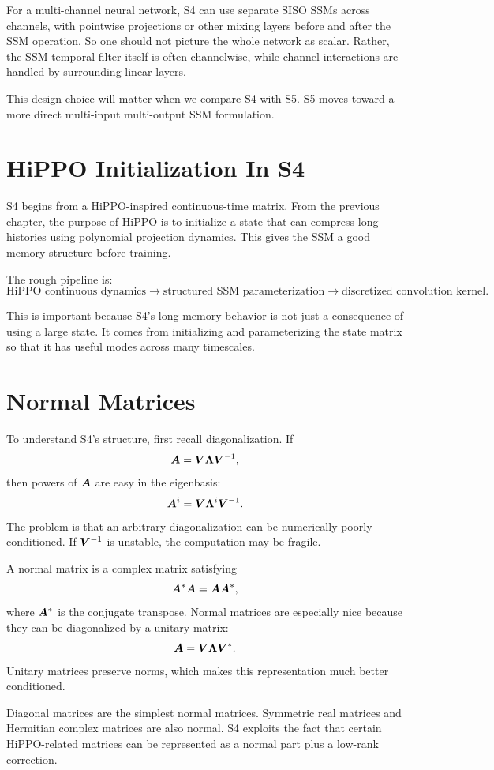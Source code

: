 For a multi-channel neural network, S4 can use separate SISO SSMs across channels, with
pointwise projections or other mixing layers before and after the SSM operation. So one
should not picture the whole network as scalar. Rather, the SSM temporal filter itself is
often channelwise, while channel interactions are handled by surrounding linear layers.

This design choice will matter when we compare S4 with S5. S5 moves toward a more direct
multi-input multi-output SSM formulation.

\section{HiPPO Initialization In S4}

S4 begins from a HiPPO-inspired continuous-time matrix. From the previous chapter, the
purpose of HiPPO is to initialize a state that can compress long histories using
polynomial projection dynamics. This gives the SSM a good memory structure before
training.

The rough pipeline is:
\[
  \text{HiPPO continuous dynamics}
  \rightarrow
  \text{structured SSM parameterization}
  \rightarrow
  \text{discretized convolution kernel}.
\]

This is important because S4's long-memory behavior is not just a consequence of using a
large state. It comes from initializing and parameterizing the state matrix so that it
has useful modes across many timescales.

\section{Normal Matrices}

To understand S4's structure, first recall diagonalization. If
\[
  \bm{A} = \bm{V}\bm{\Lambda}\bm{V}^{-1},
\]
then powers of $\bm{A}$ are easy in the eigenbasis:
\[
  \bm{A}^i = \bm{V}\bm{\Lambda}^i\bm{V}^{-1}.
\]
The problem is that an arbitrary diagonalization can be numerically poorly conditioned.
If $\bm{V}^{-1}$ is unstable, the computation may be fragile.

A normal matrix is a complex matrix satisfying
\[
  \bm{A}^*\bm{A} = \bm{A}\bm{A}^*,
\]
where $\bm{A}^*$ is the conjugate transpose. Normal matrices are especially nice because
they can be diagonalized by a unitary matrix:
\[
  \bm{A} = \bm{V}\bm{\Lambda}\bm{V}^*.
\]
Unitary matrices preserve norms, which makes this representation much better conditioned.

Diagonal matrices are the simplest normal matrices. Symmetric real matrices and Hermitian
complex matrices are also normal. S4 exploits the fact that certain HiPPO-related
matrices can be represented as a normal part plus a low-rank correction.

